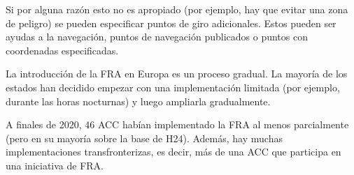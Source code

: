 Si por alguna razón esto no es apropiado (por ejemplo, hay que evitar una zona de peligro) se pueden especificar puntos de giro adicionales. Estos pueden ser ayudas a la navegación, puntos de navegación publicados o puntos con coordenadas especificadas.

La introducción de la FRA en Europa es un proceso gradual. La mayoría de los estados han decidido empezar con una implementación limitada (por ejemplo, durante las horas nocturnas) y luego ampliarla gradualmente.

A finales de 2020, 46 ACC habían implementado la FRA al menos parcialmente (pero en su mayoría sobre la base de H24). Además, hay muchas implementaciones transfronterizas, es decir, más de una ACC que participa en una iniciativa de FRA.